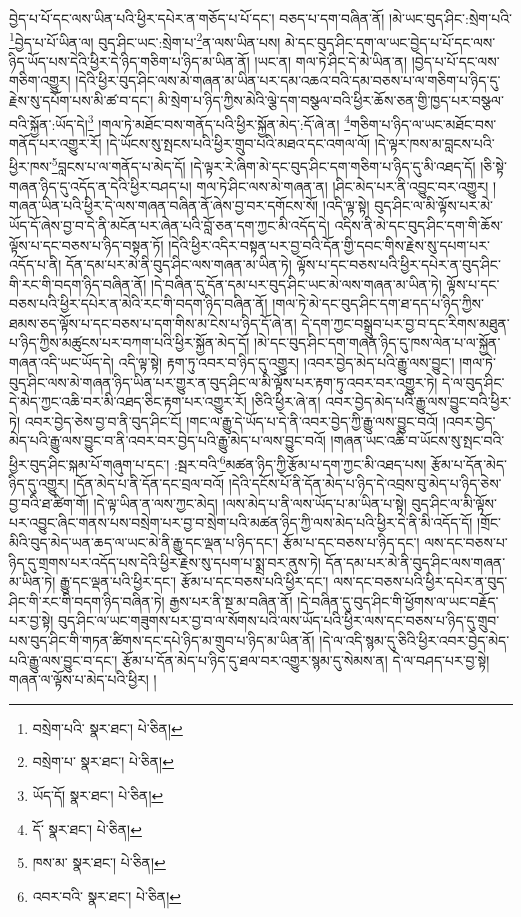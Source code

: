 བྱེད་པ་པོ་དང་ལས་ཡིན་པའི་ཕྱིར་དཔེར་ན་གཅོད་པ་པོ་དང་། བཅད་པ་དག་བཞིན་ནོ། །མེ་ཡང་བུད་ཤིང་:སྲེག་པའི་\footnote{བསྲེག་པའི་  སྣར་ཐང་།  པེ་ཅིན། }བྱེད་པ་པོ་ཡིན་ལ། བུད་ཤིང་ཡང་:སྲེག་པ་\footnote{བསྲེག་པ་  སྣར་ཐང་།  པེ་ཅིན། }ན་ལས་ཡིན་པས། མེ་དང་བུད་ཤིང་དག་ལ་ཡང་བྱེད་པ་པོ་དང་ལས་ཉིད་ཡོད་པས་དེའི་ཕྱིར་དེ་ཉིད་གཅིག་པ་ཉིད་མ་ཡིན་ནོ། །ཡང་ན། གལ་ཏེ་ཤིང་དེ་མེ་ཡིན་ན། །བྱེད་པ་པོ་དང་ལས་གཅིག་འགྱུར། །དེའི་ཕྱིར་བུད་ཤིང་ལས་མེ་གཞན་མ་ཡིན་པར་དམ་འཆའ་བའི་དམ་བཅས་པ་ལ་གཅིག་པ་ཉིད་དུ་རྗེས་སུ་དཔོག་པས་མི་ཚ་བ་དང་། མི་སྲེག་པ་ཉིད་ཀྱིས་མེའི་ལྕེ་དག་བསྩལ་བའི་ཕྱིར་ཆོས་ཅན་གྱི་ཁྱད་པར་བསྩལ་བའི་སྐྱོན་:ཡོད་དེ།\footnote{ཡོད་དོ།  སྣར་ཐང་།  པེ་ཅིན། } །གལ་ཏེ་མཐོང་བས་གནོད་པའི་ཕྱིར་སྐྱོན་མེད་:དོ་ཞེ་ན། \footnote{དོ་  སྣར་ཐང་།  པེ་ཅིན། }གཅིག་པ་ཉིད་ལ་ཡང་མཐོང་བས་གནོད་པར་འགྱུར་རོ། །དེ་ཡོངས་སུ་སྤངས་པའི་ཕྱིར་གྲུབ་པའི་མཐའ་དང་འགལ་ལོ། །དེ་ལྟར་ཁས་མ་བླངས་པའི་ཕྱིར་ཁས་\footnote{ཁས་མ་  སྣར་ཐང་།  པེ་ཅིན། }བླངས་པ་ལ་གནོད་པ་མེད་དོ། །དེ་ལྟར་རེ་ཞིག་མེ་དང་བུད་ཤིང་དག་གཅིག་པ་ཉིད་དུ་མི་འཐད་དོ། །ཅི་སྟེ་གཞན་ཉིད་དུ་འདོད་ན་དེའི་ཕྱིར་བཤད་པ། གལ་ཏེ་ཤིང་ལས་མེ་གཞན་ན། །ཤིང་མེད་པར་ནི་འབྱུང་བར་འགྱུར། །གཞན་ཡིན་པའི་ཕྱིར་དེ་ལས་གཞན་བཞིན་ནོ་ཞེས་བྱ་བར་དགོངས་སོ། །འདི་ལྟ་སྟེ། བུད་ཤིང་ལ་མི་ལྟོས་པར་མེ་ཡོད་དོ་ཞེས་བྱ་བ་དེ་ནི་མངོན་པར་ཞེན་པའི་བློ་ཅན་དག་ཀྱང་མི་འདོད་དེ། འདིས་ནི་མེ་དང་བུད་ཤིང་དག་གི་ཆོས་ལྟོས་པ་དང་བཅས་པ་ཉིད་བསྟན་ཏོ། །དེའི་ཕྱིར་འདིར་བསྟན་པར་བྱ་བའི་དོན་གྱི་དབང་གིས་རྗེས་སུ་དཔག་པར་འདོད་པ་ནི། དོན་དམ་པར་མེ་ནི་བུད་ཤིང་ལས་གཞན་མ་ཡིན་ཏེ། ལྟོས་པ་དང་བཅས་པའི་ཕྱིར་དཔེར་ན་བུད་ཤིང་གི་རང་གི་བདག་ཉིད་བཞིན་ནོ། །དེ་བཞིན་དུ་དོན་དམ་པར་བུད་ཤིང་ཡང་མེ་ལས་གཞན་མ་ཡིན་ཏེ། ལྟོས་པ་དང་བཅས་པའི་ཕྱིར་དཔེར་ན་མེའི་རང་གི་བདག་ཉིད་བཞིན་ནོ། །གལ་ཏེ་མེ་དང་བུད་ཤིང་དག་ཐ་དད་པ་ཉིད་ཀྱིས་ཐམས་ཅད་ལྟོས་པ་དང་བཅས་པ་དག་གིས་མ་ངེས་པ་ཉིད་དོ་ཞེ་ན། དེ་དག་ཀྱང་བསྒྲུབ་པར་བྱ་བ་དང་རིགས་མཐུན་པ་ཉིད་ཀྱིས་མཚུངས་པར་བཀག་པའི་ཕྱིར་སྐྱོན་མེད་དོ། །མེ་དང་བུད་ཤིང་དག་གཞན་ཉིད་དུ་ཁས་ལེན་པ་ལ་སྐྱོན་གཞན་འདི་ཡང་ཡོད་དེ། འདི་ལྟ་སྟེ། རྟག་ཏུ་འབར་བ་ཉིད་དུ་འགྱུར། །འབར་བྱེད་མེད་པའི་རྒྱུ་ལས་བྱུང་། །གལ་ཏེ་བུད་ཤིང་ལས་མེ་གཞན་ཉིད་ཡིན་པར་གྱུར་ན་བུད་ཤིང་ལ་མི་ལྟོས་པར་རྟག་ཏུ་འབར་བར་འགྱུར་ཏེ། དེ་ལ་བུད་ཤིང་དེ་མེད་ཀྱང་འཆི་བར་མི་འཐད་ཅིང་རྟག་པར་འགྱུར་རོ། །ཅིའི་ཕྱིར་ཞེ་ན། འབར་བྱེད་མེད་པའི་རྒྱུ་ལས་བྱུང་བའི་ཕྱིར་ཏེ། འབར་བྱེད་ཅེས་བྱ་བ་ནི་བུད་ཤིང་ངོ། །གང་ལ་རྒྱུ་དེ་ཡོད་པ་དེ་ནི་འབར་བྱེད་ཀྱི་རྒྱུ་ལས་བྱུང་བའོ། །འབར་བྱེད་མེད་པའི་རྒྱུ་ལས་བྱུང་བ་ནི་འབར་བར་བྱེད་པའི་རྒྱུ་མེད་པ་ལས་བྱུང་བའོ། །གཞན་ཡང་འཆི་བ་ཡོངས་སུ་སྤང་བའི་ཕྱིར་བུད་ཤིང་སྐམ་པོ་གཞུག་པ་དང་། :སྦར་བའི་\footnote{འབར་བའི་  སྣར་ཐང་།  པེ་ཅིན། }མཚན་ཉིད་ཀྱི་རྩོམ་པ་དག་ཀྱང་མི་འཐད་པས། རྩོམ་པ་དོན་མེད་ཉིད་དུ་འགྱུར། །དོན་མེད་པ་ནི་དོན་དང་བྲལ་བའོ། །དེའི་དངོས་པོ་ནི་དོན་མེད་པ་ཉིད་དེ་འབྲས་བུ་མེད་པ་ཉིད་ཅེས་བྱ་བའི་ཐ་ཚིག་གོ། །དེ་ལྟ་ཡིན་ན་ལས་ཀྱང་མེད། །ལས་མེད་པ་ནི་ལས་ཡོད་པ་མ་ཡིན་པ་སྟེ། བུད་ཤིང་ལ་མི་ལྟོས་པར་འབྱུང་ཞིང་གནས་པས་བསྲེག་པར་བྱ་བ་སྲེག་པའི་མཚན་ཉིད་ཀྱི་ལས་མེད་པའི་ཕྱིར་དེ་ནི་མི་འདོད་དོ། །གྲོང་མིའི་བུད་མེད་ཡན་ཆད་ལ་ཡང་མེ་ནི་རྒྱུ་དང་ལྡན་པ་ཉིད་དང་། རྩོམ་པ་དང་བཅས་པ་ཉིད་དང་། ལས་དང་བཅས་པ་ཉིད་དུ་གྲགས་པར་འདོད་པས་དེའི་ཕྱིར་རྗེས་སུ་དཔག་པ་སྨྲ་བར་ནུས་ཏེ། དོན་དམ་པར་མེ་ནི་བུད་ཤིང་ལས་གཞན་མ་ཡིན་ཏེ། རྒྱུ་དང་ལྡན་པའི་ཕྱིར་དང་། རྩོམ་པ་དང་བཅས་པའི་ཕྱིར་དང་། ལས་དང་བཅས་པའི་ཕྱིར་དཔེར་ན་བུད་ཤིང་གི་རང་གི་བདག་ཉིད་བཞིན་ཏེ། རྒྱས་པར་ནི་སྔ་མ་བཞིན་ནོ། །དེ་བཞིན་དུ་བུད་ཤིང་གི་ཕྱོགས་ལ་ཡང་བརྗོད་པར་བྱ་སྟེ། བུད་ཤིང་ལ་ཡང་གཟུགས་པར་བྱ་བ་ལ་སོགས་པའི་ལས་ཡོད་པའི་ཕྱིར་ལས་དང་བཅས་པ་ཉིད་དུ་གྲུབ་པས་བུད་ཤིང་གི་གཏན་ཚིགས་དང་དཔེ་ཉིད་མ་གྲུབ་པ་ཉིད་མ་ཡིན་ནོ། །དེ་ལ་འདི་སྙམ་དུ་ཅིའི་ཕྱིར་འབར་བྱེད་མེད་པའི་རྒྱུ་ལས་བྱུང་བ་དང་། རྩོམ་པ་དོན་མེད་པ་ཉིད་དུ་ཐལ་བར་འགྱུར་སྙམ་དུ་སེམས་ན། དེ་ལ་བཤད་པར་བྱ་སྟེ། གཞན་ལ་ལྟོས་པ་མེད་པའི་ཕྱིར། །
